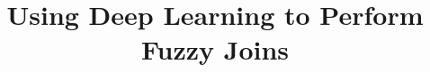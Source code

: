 \documentclass{vldb}
\begin{document}

\title{Using Deep Learning to Perform Fuzzy Joins}



%
%
%
%

\end{document}
